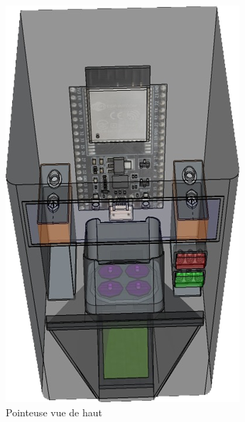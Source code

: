 \begin{figure}[!htb]
\begin{minipage}{0.5\textwidth}
         \includegraphics[scale=0.6]{images/prototype/2.png}
         \caption{Pointeuse vue de haut}\label{ }
       \end{minipage}
    \end{figure}
    
